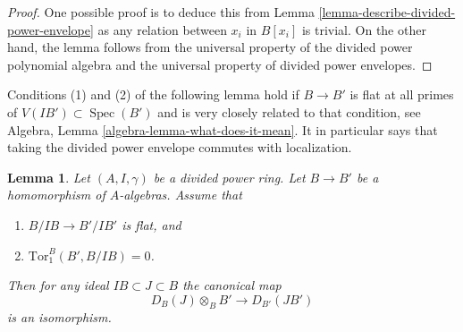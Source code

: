 \documentclass{stacks-project}
\theoremstyle{plain}
\newtheorem{lemma}[subsection]{Lemma}
\theoremstyle{definition}
\theoremstyle{remark}
\numberwithin{equation}{subsection}
\def\Spec{\mathop{\mathrm{Spec}}}
\begin{document}
\begin{proof}
One possible proof is to deduce this from
Lemma \ref{lemma-describe-divided-power-envelope}
as any relation between $x_i$ in $B[x_i]$ is trivial.
On the other hand, the lemma follows from the universal property
of the divided power polynomial algebra and the universal property of
divided power envelopes.
\end{proof}

\noindent
Conditions (1) and (2) of the following lemma hold if $B \to B'$ is flat
at all primes of $V(IB') \subset \Spec(B')$ and is very closely related
to that condition, see
Algebra, Lemma \ref{algebra-lemma-what-does-it-mean}.
It in particular says that taking the divided power
envelope commutes with localization.

\begin{lemma}
\label{lemma-flat-base-change-divided-power-envelope}
Let $(A, I, \gamma)$ be a divided power ring.
Let $B \to B'$ be a homomorphism of $A$-algebras.
Assume that
\begin{enumerate}
\item $B/IB \to B'/IB'$ is flat, and
\item $\text{Tor}_1^B(B', B/IB) = 0$.
\end{enumerate}
Then for any ideal $IB \subset J \subset B$ the canonical map
$$
D_B(J) \otimes_B B' \longrightarrow D_{B'}(JB')
$$
is an isomorphism.
\end{lemma}
\end{document}
